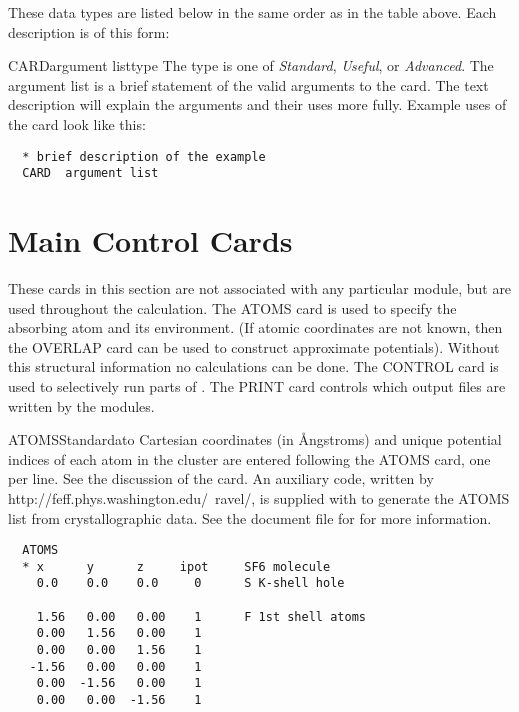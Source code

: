 \documentclass[11pt,oneside]{report} %
\begin{document}
These data types are listed below in the same order as in the table above.
Each description is of this form:

\begin{Card}{CARD}{argument list}{type}{}
  The type is one of \textsl{Standard}, \textsl{Useful}, or
  \textsl{Advanced}.  The argument list is a brief statement of the
  valid arguments to the card.  The text description will explain the
  arguments and their uses more fully.  Example uses of the card look
  like this:
\begin{verbatim}
  * brief description of the example
  CARD  argument list
\end{verbatim}
\end{Card}



\section{Main Control Cards}
\label{sec:Main-Control-Cards}


These cards in this section are not associated with any particular
module, but are used throughout the {\feff} calculation.  The ATOMS
card is used to specify the absorbing atom and its environment.  (If
atomic coordinates are not known, then the OVERLAP card can be used to
construct approximate potentials).  Without this structural
information no calculations can be done.  The CONTROL card is used to
selectively run parts of {\feff}.  The PRINT card controls which
output files are written by the modules.



\begin{Card}{ATOMS}{}{Standard}{ato}
  Cartesian coordinates (in \AA ngstroms) and unique potential indices
  of each atom in the cluster are entered following the ATOMS card,
  one per line.  See the discussion of the
   card.  An auxiliary code, {\atoms}
  written by 
  {http://feff.phys.washington.edu/~ravel/}, is supplied with
  {\feff} to generate the ATOMS list from crystallographic data.  See
  the document file for {\atoms} for more information.
\begin{verbatim}
  ATOMS
  * x      y      z     ipot     SF6 molecule
    0.0    0.0    0.0     0      S K-shell hole

    1.56   0.00   0.00    1      F 1st shell atoms
    0.00   1.56   0.00    1
    0.00   0.00   1.56    1
   -1.56   0.00   0.00    1
    0.00  -1.56   0.00    1
    0.00   0.00  -1.56    1
\end{verbatim}
\end{Card}
\end{document}

